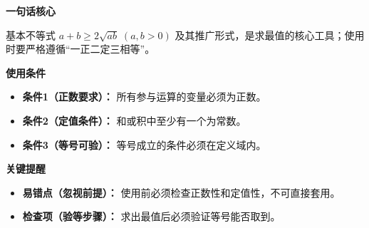 \begin{summarybox}
	\textbf{\textcolor{CSummary}{一句话核心}}

	基本不等式 $a+b\ge2\sqrt{ab}\;(a,b>0)$ 及其推广形式，是求最值的核心工具；使用时要严格遵循“一正二定三相等”。

	\medskip
	\textbf{\textcolor{CSummary}{使用条件}}
	\begin{itemize}[leftmargin=*, itemsep=0.5em, topsep=0.4em]
		\item \textbf{条件1（正数要求）：} 所有参与运算的变量必须为正数。
		\item \textbf{条件2（定值条件）：} 和或积中至少有一个为常数。
		\item \textbf{条件3（等号可验）：} 等号成立的条件必须在定义域内。
	\end{itemize}

	\medskip
	\textbf{\textcolor{CSummary}{关键提醒}}
	\begin{itemize}[leftmargin=*, itemsep=0.5em, topsep=0.4em]
		\item \textbf{易错点（忽视前提）：} 使用前必须检查正数性和定值性，不可直接套用。
		\item \textbf{检查项（验等步骤）：} 求出最值后必须验证等号能否取到。
	\end{itemize}
\end{summarybox}
